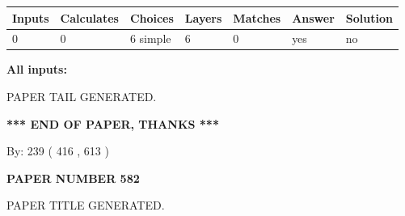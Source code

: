 \documentclass[12pt]{article}
\begin{document}
   
\noindent\begin{tabular}{|l|l|l|l|l|l|l|}
 \hline
Inputs & Calculates & Choices & Layers & Matches & Answer & Solution \\ \hline
 0  & 
 0  & 
 6
  simple  
  & 
 6  & 
 0  & 
  yes & 
  no 
  \\ \hline
 \end{tabular}
   
   
   
   
\noindent{}
   
   
   
   
\noindent\vspace{0.1in}\hspace{-0.08in} {\textbf{\Large{All inputs: }}}
   
   
   
   
   
   
 \vspace{0.2in}
 
   
   
\vspace{2.0in} PAPER TAIL GENERATED.
   
   
   
   
\vspace{1.0in} 
{\textbf{\large{ *** END OF PAPER, THANKS *** }}} 
   
   
\hspace{1.0in} By: 
 239 ( 416 ,  613 )
   
   
   
   
\newpage 
\setcounter{page}{ 
   582001 } 
   
   
   
   
 {\textbf{ \Large{ PAPER NUMBER  582  }}}
   
   
\vspace{0.2in}
   
   
   
   
   
   
   
   
 \vspace{0.2in}
 
 
 
 
   
   
 PAPER TITLE GENERATED.
   
   
   
\vspace{0.2in}
   
\end{document}
